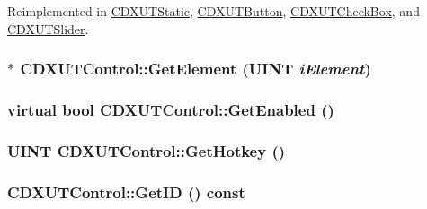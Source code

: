 Reimplemented in \hyperlink{class_c_d_x_u_t_static_ae32024764670a1f5b1ad0ba4a8570d63}{CDXUTStatic}, \hyperlink{class_c_d_x_u_t_button_a2209ea24f5ba76d7506b368c80940172}{CDXUTButton}, \hyperlink{class_c_d_x_u_t_check_box_af0a106a73957da96d23dd53c2b9da8e8}{CDXUTCheckBox}, and \hyperlink{class_c_d_x_u_t_slider_a8c3b16c9ae0c7aa68797f58aced30d16}{CDXUTSlider}.\hypertarget{class_c_d_x_u_t_control_a4f6164a6360791491abcf9fdeebf3f6d}{
\subsubsection[{GetElement}]{$\ast$ CDXUTControl::GetElement (UINT {\em iElement})}}
\label{class_c_d_x_u_t_control_a4f6164a6360791491abcf9fdeebf3f6d}
\hypertarget{class_c_d_x_u_t_control_a9d556d25a81317b1499b4cb292ba974b}{
\subsubsection[{GetEnabled}]{\setlength{\rightskip}{0pt plus 5cm}virtual bool CDXUTControl::GetEnabled ()}}
\label{class_c_d_x_u_t_control_a9d556d25a81317b1499b4cb292ba974b}
\hypertarget{class_c_d_x_u_t_control_a693c6f243a46206fec1cc2d5ef6c5556}{
\subsubsection[{GetHotkey}]{\setlength{\rightskip}{0pt plus 5cm}UINT CDXUTControl::GetHotkey ()}}
\label{class_c_d_x_u_t_control_a693c6f243a46206fec1cc2d5ef6c5556}
\hypertarget{class_c_d_x_u_t_control_ad8c4cecdf845ce2d533b382747ed4a02}{
\subsubsection[{GetID}]{ CDXUTControl::GetID () const}}

